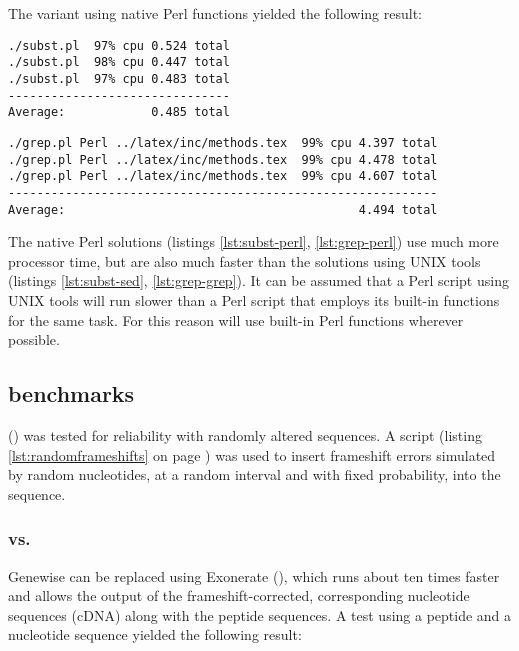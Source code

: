 The variant using native Perl functions yielded the following result:

\begin{verbatim}
./subst.pl  97% cpu 0.524 total
./subst.pl  98% cpu 0.447 total
./subst.pl  97% cpu 0.483 total
-------------------------------
Average:            0.485 total
\end{verbatim}



\begin{verbatim}
./grep.pl Perl ../latex/inc/methods.tex  99% cpu 4.397 total
./grep.pl Perl ../latex/inc/methods.tex  99% cpu 4.478 total
./grep.pl Perl ../latex/inc/methods.tex  99% cpu 4.607 total
------------------------------------------------------------
Average:                                         4.494 total
\end{verbatim}

The native Perl solutions (listings \ref{lst:subst-perl}, \ref{lst:grep-perl})
use much more processor time, but are also much faster than the solutions using
UNIX tools (listings \ref{lst:subst-sed}, \ref{lst:grep-grep}). It can be
assumed that a Perl script using UNIX tools will run slower than a Perl script
that employs its built-in functions for the same task. For this reason
\pname will use built-in Perl functions wherever possible.

\subsection{ benchmarks}

 (\cite{Birney2004}) was tested for reliability with randomly
altered sequences. A script (listing \ref{lst:randomframeshifts} on page
\pageref{lst:randomframeshifts}) was used to insert frameshift errors simulated
by random nucleotides, at a random interval and with fixed probability, into
the sequence. 

\subsubsection{ vs. }

Genewise can be replaced using Exonerate (\cite{Slater2005}), which runs about
ten times faster and allows the output of the frameshift-corrected,
corresponding nucleotide sequences (cDNA) along with the peptide sequences.
A test using a peptide and a nucleotide sequence yielded the following result:

